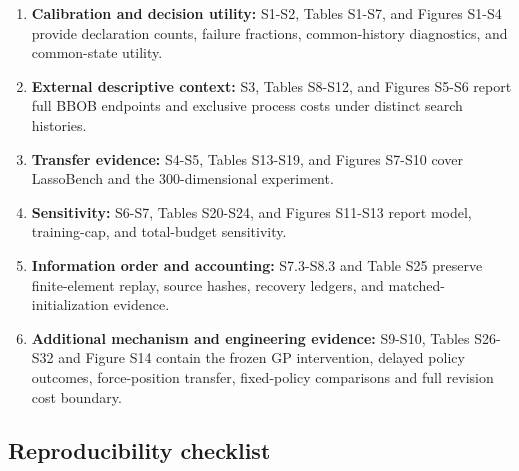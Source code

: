 \documentclass[suppldata]{interact}
\providecommand{\tightlist}{\setlength{\itemsep}{0pt}\setlength{\parskip}{0pt}}
\begin{document}
\begin{enumerate}
\def\labelenumi{\arabic{enumi}.}
\tightlist
\item
  \textbf{Calibration and decision utility:} S1-S2, Tables S1-S7, and Figures S1-S4 provide declaration counts, failure fractions, common-history diagnostics, and common-state utility.
\item
  \textbf{External descriptive context:} S3, Tables S8-S12, and Figures S5-S6 report full BBOB endpoints and exclusive process costs under distinct search histories.
\item
  \textbf{Transfer evidence:} S4-S5, Tables S13-S19, and Figures S7-S10 cover LassoBench and the 300-dimensional experiment.
\item
  \textbf{Sensitivity:} S6-S7, Tables S20-S24, and Figures S11-S13 report model, training-cap, and total-budget sensitivity.
\item
  \textbf{Information order and accounting:} S7.3-S8.3 and Table S25 preserve finite-element replay, source hashes, recovery ledgers, and matched-initialization evidence.
\item
  \textbf{Additional mechanism and engineering evidence:} S9-S10, Tables S26-S32 and Figure S14 contain the frozen GP intervention, delayed policy outcomes, force-position transfer, fixed-policy comparisons and full revision cost boundary.
\end{enumerate}

\hypertarget{reproducibility-checklist}{%
\subsection{Reproducibility checklist}\label{reproducibility-checklist}}
\end{document}
